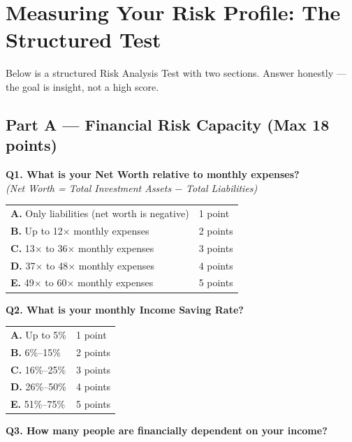 \documentclass[12pt,a4paper]{article}
\begin{document}
\section{Measuring Your Risk Profile: The Structured Test}

Below is a structured Risk Analysis Test with two sections. Answer honestly --- the goal is insight, not a high score.

\subsection{Part A --- Financial Risk Capacity (Max 18 points)}

\begin{tcolorbox}[base, colback=CapacityColor!7, colframe=CapacityColor, breakable]
\textbf{\color{CapacityColor}Q1. What is your Net Worth relative to monthly expenses?}\\
\textit{(Net Worth = Total Investment Assets $-$ Total Liabilities)}

\medskip
\begin{tabular}{ll}
\textbf{A.} Only liabilities (net worth is negative) & 1 point\\
\textbf{B.} Up to 12$\times$ monthly expenses & 2 points\\
\textbf{C.} 13$\times$ to 36$\times$ monthly expenses & 3 points\\
\textbf{D.} 37$\times$ to 48$\times$ monthly expenses & 4 points\\
\textbf{E.} 49$\times$ to 60$\times$ monthly expenses & 5 points\\
\end{tabular}

\bigskip
\textbf{\color{CapacityColor}Q2. What is your monthly Income Saving Rate?}

\medskip
\begin{tabular}{ll}
\textbf{A.} Up to 5\% & 1 point\\
\textbf{B.} 6\%--15\% & 2 points\\
\textbf{C.} 16\%--25\% & 3 points\\
\textbf{D.} 26\%--50\% & 4 points\\
\textbf{E.} 51\%--75\% & 5 points\\
\end{tabular}

\bigskip
\textbf{\color{CapacityColor}Q3. How many people are financially dependent on your income?}


\end{tcolorbox}
\end{document}
